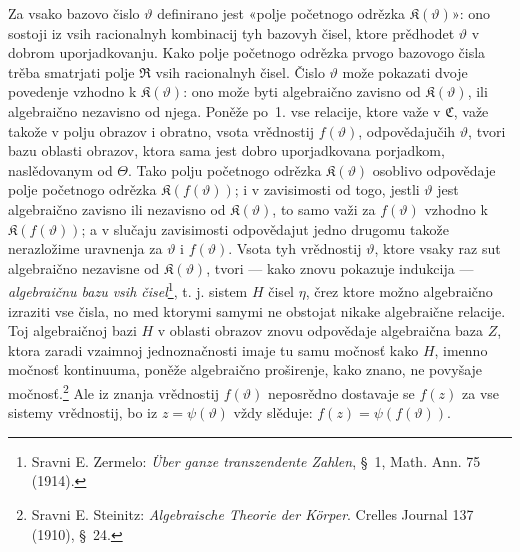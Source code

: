 \documentclass[11pt]{article}
\providecommand{\Cfield}{\mathfrak C}
\providecommand{\Kfield}{\mathfrak K}
\providecommand{\Rfield}{\mathfrak R}
\begin{document}
Za vsako bazovo čislo \(\vartheta\) definirano jest «polje početnogo odrězka \(\Kfield(\vartheta)\)»: ono sostoji iz vsih racionalnyh kombinacij tyh bazovyh čisel, ktore prědhodet \(\vartheta\) v dobrom uporjadkovanju. Kako polje početnogo odrězka prvogo bazovogo čisla trěba smatrjati polje \(\Rfield\) vsih racionalnyh čisel. Čislo \(\vartheta\) može pokazati dvoje povedenje vzhodno k \(\Kfield(\vartheta)\): ono može byti algebraično zavisno od \(\Kfield(\vartheta)\), ili algebraično nezavisno od njega. Poněže po~1. vse relacije, ktore važe v \(\Cfield\), važe takože v polju obrazov i obratno, vsota vrědnostij \(f(\vartheta)\), odpovědajučih \(\vartheta\), tvori bazu oblasti obrazov, ktora sama jest dobro uporjadkovana porjadkom, naslědovanym od \(\Theta\). Tako polju početnogo odrězka \(\Kfield(\vartheta)\) osoblivo odpovědaje polje početnogo odrězka \(\Kfield(f(\vartheta))\); i v zavisimosti od togo, jestli \(\vartheta\) jest algebraično zavisno ili nezavisno od \(\Kfield(\vartheta)\), to samo važi za \(f(\vartheta)\) vzhodno k \(\Kfield(f(\vartheta))\); a v slučaju zavisimosti odpovědajut jedno drugomu takože nerazložime uravnenja za \(\vartheta\) i \(f(\vartheta)\). Vsota tyh vrědnostij \(\vartheta\), ktore vsaky raz sut algebraično nezavisne od \(\Kfield(\vartheta)\), tvori --- kako znovu pokazuje indukcija --- {\itshape algebraičnu bazu vsih čisel}\footnote{Sravni E. Zermelo: \emph{Über ganze transzendente Zahlen}, \S\ 1, Math. Ann. 75 (1914).}, t. j. sistem \(H\) čisel \(\eta\), črez ktore možno algebraično izraziti vse čisla, no med ktorymi samymi ne obstojat nikake algebraične relacije. Toj algebraičnoj bazi \(H\) v oblasti obrazov znovu odpovědaje algebraična baza \(Z\), ktora zaradi vzaimnoj jednoznačnosti imaje tu samu močnosť kako \(H\), imenno močnosť kontinuuma, poněže algebraično proširenje, kako znano, ne povyšaje močnosť.\footnote{Sravni E. Steinitz: \emph{Algebraische Theorie der Körper}. Crelles Journal 137 (1910), \S\ 24.} Ale iz znanja vrědnostij \(f(\vartheta)\) neposrědno dostavaje se \(f(z)\) za vse sistemy vrědnostij, bo iz \(z=\psi(\vartheta)\) vždy slěduje: \(f(z)=\psi(f(\vartheta))\).
\end{document}
